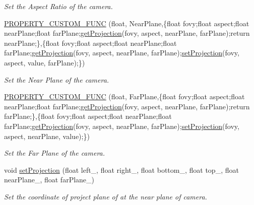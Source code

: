 \begin{DoxyCompactItemize}
\begin{DoxyCompactList}\small\item\em Set the Aspect Ratio of the camera. \end{DoxyCompactList}\item 
\hyperlink{class_i_dream_sky_1_1_perspective_camera_component_ae379456daa482d8e76af311ed3f4a161}{P\+R\+O\+P\+E\+R\+T\+Y\+\_\+\+C\+U\+S\+T\+O\+M\+\_\+\+F\+U\+NC} (float, Near\+Plane,\{float fovy;float aspect;float near\+Plane;float far\+Plane;\hyperlink{class_i_dream_sky_1_1_perspective_camera_component_ae3ce00b7bbf1c9e9e073f28793dd1645}{get\+Projection}(fovy, aspect, near\+Plane, far\+Plane);return near\+Plane;\},\{float fovy;float aspect;float near\+Plane;float far\+Plane;\hyperlink{class_i_dream_sky_1_1_perspective_camera_component_ae3ce00b7bbf1c9e9e073f28793dd1645}{get\+Projection}(fovy, aspect, near\+Plane, far\+Plane);\hyperlink{class_i_dream_sky_1_1_perspective_camera_component_a6b49a13999f7fb6593ca845c10579795}{set\+Projection}(fovy, aspect, value, far\+Plane);\})
\begin{DoxyCompactList}\small\item\em Set the Near Plane of the camera. \end{DoxyCompactList}\item 
\hyperlink{class_i_dream_sky_1_1_perspective_camera_component_afb046dfc096594aff378f55252497407}{P\+R\+O\+P\+E\+R\+T\+Y\+\_\+\+C\+U\+S\+T\+O\+M\+\_\+\+F\+U\+NC} (float, Far\+Plane,\{float fovy;float aspect;float near\+Plane;float far\+Plane;\hyperlink{class_i_dream_sky_1_1_perspective_camera_component_ae3ce00b7bbf1c9e9e073f28793dd1645}{get\+Projection}(fovy, aspect, near\+Plane, far\+Plane);return far\+Plane;\},\{float fovy;float aspect;float near\+Plane;float far\+Plane;\hyperlink{class_i_dream_sky_1_1_perspective_camera_component_ae3ce00b7bbf1c9e9e073f28793dd1645}{get\+Projection}(fovy, aspect, near\+Plane, far\+Plane);\hyperlink{class_i_dream_sky_1_1_perspective_camera_component_a6b49a13999f7fb6593ca845c10579795}{set\+Projection}(fovy, aspect, near\+Plane, value);\})
\begin{DoxyCompactList}\small\item\em Set the Far Plane of the camera. \end{DoxyCompactList}\item 
void \hyperlink{class_i_dream_sky_1_1_perspective_camera_component_a6b49a13999f7fb6593ca845c10579795}{set\+Projection} (float left\+\_\+, float right\+\_\+, float bottom\+\_\+, float top\+\_\+, float near\+Plane\+\_\+, float far\+Plane\+\_\+)
\begin{DoxyCompactList}\small\item\em Set the coordinate of project plane of at the near plane of camera. \end{DoxyCompactList}\item 

\end{DoxyCompactItemize}
